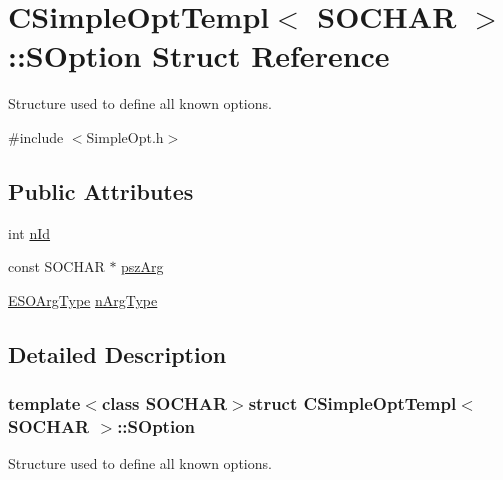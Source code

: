 \hypertarget{struct_c_simple_opt_templ_1_1_s_option}{\section{C\-Simple\-Opt\-Templ$<$ S\-O\-C\-H\-A\-R $>$\-:\-:S\-Option Struct Reference}
\label{struct_c_simple_opt_templ_1_1_s_option}
}


Structure used to define all known options.  




{\ttfamily \#include $<$Simple\-Opt.\-h$>$}

\subsection*{Public Attributes}
\begin{DoxyCompactItemize}
\item 
int \hyperlink{struct_c_simple_opt_templ_1_1_s_option_a10837f04451fe178b47f1c956db23964}{n\-Id}
\item 
const S\-O\-C\-H\-A\-R $\ast$ \hyperlink{struct_c_simple_opt_templ_1_1_s_option_a98c6fe397df4a04140d549373c18622b}{psz\-Arg}
\item 
\hyperlink{_simple_opt_8h_a50e7da6846dce876e059a7ddf17f90c1}{E\-S\-O\-Arg\-Type} \hyperlink{struct_c_simple_opt_templ_1_1_s_option_a183ddbb6c06a3578db4dfb26fce16f21}{n\-Arg\-Type}
\end{DoxyCompactItemize}


\subsection{Detailed Description}
\subsubsection*{template$<$class S\-O\-C\-H\-A\-R$>$struct C\-Simple\-Opt\-Templ$<$ S\-O\-C\-H\-A\-R $>$\-::\-S\-Option}

Structure used to define all known options. 


